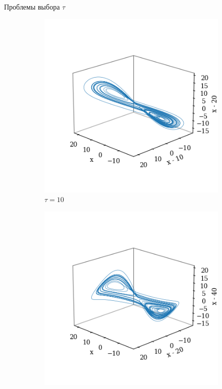 \begin{frame}{Проблемы выбора $\tau$}
\begin{figure}
\begin{subfigure}[b]{0.24\textwidth}
    \includegraphics[width=\linewidth]{lecture_4/figs/tde_lorenz_tau_10.png}
    \caption{$\tau=10$}
  \end{subfigure}
  \begin{subfigure}[b]{0.24\textwidth}
    \includegraphics[width=\linewidth]{lecture_4/figs/tde_lorenz_tau_20.png}

\end{subfigure}
\end{figure}
\end{frame}
